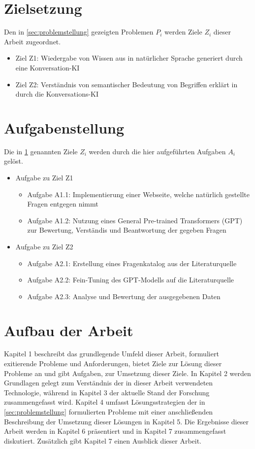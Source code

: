 \section{Zielsetzung}\label{sec:zielsetzung}

Den in \ref{sec:problemstellung} gezeigten Problemen $P_i$ werden Ziele $Z_i$ dieser Arbeit zugeordnet.

\begin{itemize}
  \item Ziel Z1: Wiedergabe von Wissen aus \citet{bb} in natürlicher Sprache generiert durch eine Konversation-KI
  \item Ziel Z2: Verständnis von semantischer Bedeutung von Begriffen erklärt in \citet{bb} durch die Konversations-KI
\end{itemize}

\section{Aufgabenstellung}

Die in \ref{sec:zielsetzung} genannten Ziele $Z_i$ werden durch die hier aufgeführten Aufgaben $A_i$ gelöst.

\begin{itemize}
  \item Aufgabe zu Ziel Z1
  \begin{itemize}
    \item Aufgabe A1.1: Implementierung einer Webseite, welche natürlich gestellte Fragen entgegen nimmt
    \item Aufgabe A1.2: Nutzung eines General Pre-trained Transformers (GPT) zur Bewertung, Verständis und Beantwortung der gegeben Fragen
  \end{itemize}
  \item Aufgabe zu Ziel Z2
  \begin{itemize}
    \item Aufgabe A2.1: Erstellung eines Fragenkatalog aus der Literaturquelle
    \item Aufgabe A2.2: Fein-Tuning des GPT-Modells auf die Literaturquelle
    \item Aufgabe A2.3: Analyse und Bewertung der ausgegebenen Daten
  \end{itemize}
\end{itemize}

\section{Aufbau der Arbeit}
Kapitel 1 beschreibt das grundlegende Umfeld dieser Arbeit, formuliert exitierende Probleme und Anforderungen, bietet Ziele zur Lösung dieser Probleme an und gibt Aufgaben, zur Umsetzung dieser Ziele. 
In Kapitel 2 werden Grundlagen gelegt zum Verständnis der in dieser Arbeit verwendeten Technologie, während in Kapitel 3 der aktuelle Stand der Forschung zusammengefasst wird. 
Kapitel 4 umfasst Lösungsstrategien der in \ref{sec:problemstellung} formulierten Probleme mit einer anschließenden Beschreibung der Umsetzung dieser Lösungen in Kapitel 5. 
Die Ergebnisse dieser Arbeit werden in Kapitel 6 präsentiert und in Kapitel 7 zusammengefasst diskutiert. Zusätzlich gibt Kapitel 7 einen Ausblick dieser Arbeit.